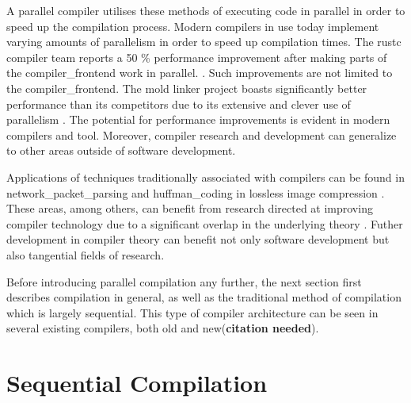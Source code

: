 A parallel compiler utilises these methods of executing code in parallel
in order to speed up the compilation process. Modern compilers in use today
implement varying amounts of parallelism in order to speed up compilation
times. The \gls{rustc} compiler team reports a 50 \% performance improvement
after making parts of the \gls{compiler_frontend} work in parallel.
\citep{nicholas_nethercote_faster_2023}. Such improvements are not limited to
the \gls{compiler_frontend}. The mold \gls{linker} project boasts significantly
better performance than its competitors due to its extensive and clever use
of parallelism \citep{rui_ueyama_design_nodate}. The potential for performance
improvements is evident in modern compilers and tool. Moreover, compiler
research and development can generalize to other areas outside of software
development.

Applications of techniques traditionally associated with compilers can
be found in \gls{network_packet_parsing} \citep{wang_hyperscan_2019,
roesch_snort_1999} and \gls{huffman_coding} in lossless image compression
\citep{howard_parallel_1996}. These areas, among others, can benefit from
research directed at improving compiler technology due to a significant
overlap in the underlying theory \citep{mytkowicz_data-parallel_2014}. Futher
development in compiler theory can benefit not only software development but
also tangential fields of research.

Before introducing parallel compilation any further, the next section
first describes compilation in general, as well as the traditional method of
compilation which is largely sequential. This type of compiler architecture can
be seen in several existing compilers, both old and new(\textbf{citation needed}).

\section{Sequential Compilation}

